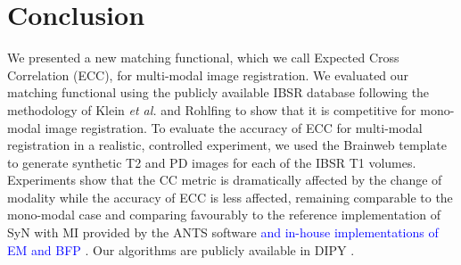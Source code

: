 \section{Conclusion}
We presented a new matching functional, which we call Expected Cross Correlation (ECC), for multi-modal image registration. We evaluated our matching functional using the publicly available IBSR database following the methodology of Klein {\it et al.} \cite{Klein2009, Klein2010} and Rohlfing \cite{Rohlfing2012} to show that it is competitive for mono-modal image registration. To evaluate the accuracy of ECC for multi-modal registration in a realistic, controlled experiment, we used the Brainweb \cite{Cocosco1997, Kwan1999} template to generate synthetic T2 and PD images for each of the IBSR T1 volumes. Experiments show that the CC metric is dramatically affected by the change of modality while the accuracy of ECC is less affected, remaining comparable to the mono-modal case and comparing favourably to the reference implementation of SyN with MI \cite{Mattes2003} provided by the ANTS software \textcolor{blue}{ and in-house implementations of EM \cite{Arce-santana2014} and BFP \cite{Guimond2001}}. Our algorithms are publicly available in DIPY \cite{Garyfallidis2014}.


